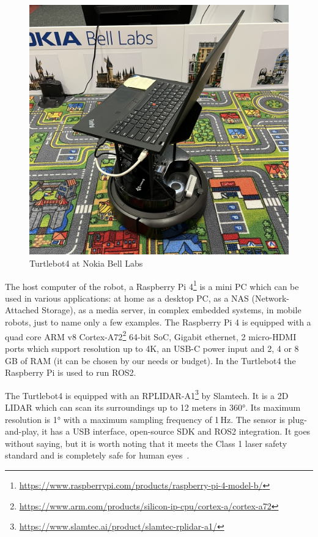 \begin{figure}[htbp]
    \centering
    \includegraphics[width=150mm, keepaspectratio]{figures/turtlebot4_nokia.JPEG}
    \caption{Turtlebot4 at Nokia Bell Labs}
    \label{fig:turtlebot4_nokia}
\end{figure}




The host computer of the robot, a Raspberry Pi 4\footnote{\url{https://www.raspberrypi.com/products/raspberry-pi-4-model-b/}} is a mini PC which can be used in various applications:
at home as a desktop PC,
as a NAS (Network-Attached Storage),
as a media server,
in complex embedded systems,
in mobile robots, just to name only a few examples.
The Raspberry Pi 4 is equipped with a quad core ARM v8 Cortex-A72\footnote{\url{https://www.arm.com/products/silicon-ip-cpu/cortex-a/cortex-a72}} 64-bit SoC, Gigabit ethernet, 2 micro-HDMI ports which support resolution up to 4K, an USB-C power input and 2, 4 or 8 GB of RAM (it can be chosen by our needs or budget). In the Turtlebot4 the Raspberry Pi is used to run ROS2.


The Turtlebot4 is equipped with an RPLIDAR-A1\footnote{\url{https://www.slamtec.ai/product/slamtec-rplidar-a1/}} by Slamtech. It is a 2D LIDAR which can scan its surroundings up to 12 meters in 360°. Its maximum resolution is 1° with a maximum sampling frequency of 1\,Hz.
The sensor is plug-and-play, it has a USB interface, open-source SDK and ROS2 integration. It goes without saying, but it is worth noting that it meets the Class 1 laser safety standard and is completely safe for human eyes~\cite{LaserSafety}.

